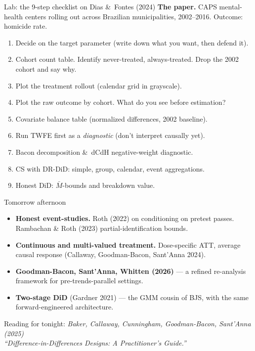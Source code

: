 \documentclass[aspectratio=169,11pt]{beamer}
\begin{document}
\begin{frame}{Lab: the 9-step checklist on Dias \&\ Fontes (2024)}
\vspace{0.2em}
\textbf{The paper.} \;CAPS mental-health centers rolling out across Brazilian municipalities, 2002--2016. \;Outcome: homicide rate.
\vspace{0.4em}
\begin{enumerate}\scriptsize
  \item Decide on the target parameter (write down what you want, then defend it).
  \item Cohort count table. \;Identify never-treated, always-treated. \;Drop the 2002 cohort and say why.
  \item Plot the treatment rollout (calendar grid in grayscale).
  \item Plot the raw outcome by cohort. \;What do you see before estimation?
  \item Covariate balance table (normalized differences, 2002 baseline).
  \item Run TWFE first as a \textit{diagnostic} (don't interpret causally yet).
  \item Bacon decomposition \&\ dCdH negative-weight diagnostic.
  \item CS with DR-DiD: simple, group, calendar, event aggregations.
  \item Honest DiD: $\bar M$-bounds and breakdown value.
\end{enumerate}
\vspace{0.3em}
\end{frame}

\begin{frame}{Tomorrow afternoon}
\vspace{0.5em}
\begin{itemize}
  \item \textbf{Honest event-studies.} \;Roth (2022) on conditioning on pretest passes. \;Rambachan \& Roth (2023) partial-identification bounds.
  \item \textbf{Continuous and multi-valued treatment.} \;Dose-specific ATT, average causal response (Callaway, Goodman-Bacon, Sant'Anna 2024).
  \item \textbf{Goodman-Bacon, Sant'Anna, Whitten (2026)} --- a refined re-analysis framework for pre-trends-parallel settings.
  \item \textbf{Two-stage DiD} (Gardner 2021) --- the GMM cousin of BJS, with the same forward-engineered architecture.
\end{itemize}

\vspace{0.7em}
\begin{center}\large
Reading for tonight: \;\textit{Baker, Callaway, Cunningham, Goodman-Bacon, Sant'Anna (2025)}\\
\textit{``Difference-in-Differences Designs: A Practitioner's Guide.''}
\end{center}
\end{frame}
\end{document}
